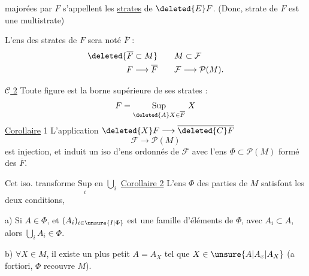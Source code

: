 
majorées par $F$ s'appellent les \uline{strates} de $\deleted{E}F$. (Donc,  strate de $F$ est une multistrate)

L'ens des strates de $F$  sera noté $\overline F$ : \[ \begin{aligned} \deleted{\overline F\subset M} &\qquad  M\subset\mathcal F\\ F\longrightarrow\overline F &\qquad \mathcal F\longrightarrow\mathcal P( M). \end{aligned} \]

\uline{$\mathcal C$ 2} Toute figure est la borne supérieure de ses strates : \[ F=\underset{\deleted{A}X\in\overline F}{\mathrm{Sup}}\ X \]
\uline{Corollaire} 1 L'application $\deleted{X}F\longrightarrow\overline{\deleted{C}F}$ \[ \mathcal F\longrightarrow\mathcal P( M) \] est injection, et induit un iso d'ens ordonnés de $\mathcal F$ avec l'ens $\Phi\subset\mathcal P( M)$ formé des $\overline F$.

Cet iso. transforme $\underset{i}{\mathrm{Sup}}$ en $\bigcup_i$
\uline{Corollaire 2} L'ens $\Phi$ des parties de $ M$ satisfont les deux conditions,


 a) Si $A\in\Phi$, et $(A_i)_{i\in\unsure{I|\Phi}}$ est une famille d'éléments de $\Phi$, avec $A_i\subset A$, alors $\bigcup_iA_i\in\Phi$.

b) $\forall X\in M$, il existe un plus petit $A=A_X$ tel que $X\in\unsure{A|A_x|A_X}$ (a fortiori, $\Phi$ recouvre $ M$).
